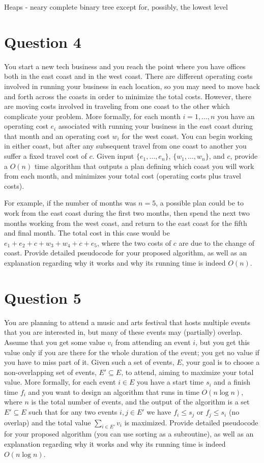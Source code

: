 \documentclass{article}
\begin{document}
Heaps - neary complete binary tree except for, possibly, the lowest level


\section*{Question 4}
You start a new tech business and you reach the point where you have offices both in the
east coast and in the west coast. There are different operating costs involved in running your business
in each location, so you may need to move back and forth across the coasts in order to minimize the total
costs. However, there are moving costs involved in traveling from one coast to the other which complicate
your problem. More formally, for each month $i=1,\dots, n$ you have an operating cost $e_i$ associated
with running your business in the east coast during that month and an operating cost $w_i$ for the west coast.
You can begin working in either coast, but after any subsequent travel from one coast to another you suffer
a fixed travel cost of $c$. Given input $\{e_1,\dots, e_n\}$, $\{w_1,\dots, w_n\}$, and $c$, provide a $O(n)$
time algorithm that outputs a plan defining which coast you will work from each month, and minimizes your
total cost (operating costs plus travel costs).

For example, if the number of months was $n=5$, a possible plan could be to work from the east coast during
the first two months, then spend the next two months working from the west coast, and return to the east coast
for the fifth and final month. The total cost in this case would be $e_1+e_2+c+ w_3+w_4+c +e_5$, where the
two costs of $c$ are due to the change of coast. Provide detailed pseudocode for your proposed algorithm, as
well as an explanation regarding why it works and why its running time is indeed $O(n)$.

\section*{Question 5}
You are planning to attend a music and arts festival that hosts multiple events that
you are interested in, but many of these events may (partially) overlap. Assume that you get some value
$v_i$ from attending an event $i$, but you get this value only if you are there for the whole duration
of the event; you get no value if you have to miss part of it. Given such a set of events, $E$, your
goal is to choose a non-overlapping set of events, $E'\subseteq E$, to attend, aiming to maximize your
total value. More formally, for each event $i\in E$ you have a start time $s_i$ and a finish time $f_i$ and
you want to design an algorithm that runs in time $O(n\log n)$, where $n$ is the total number of events,
and the output of the algorithm is a set $E'\subseteq E$ such that for any two events $i,j\in E'$ we have
$f_i\leq s_j$ or $f_j \leq s_i$ (no overlap) and the total value $\sum_{i\in E'} v_i$ is maximized. Provide
detailed pseudocode for your proposed algorithm (you can use sorting as a subroutine), as well as an explanation
regarding why it works and why its running time is indeed $O(n\log n)$.
\end{document}
